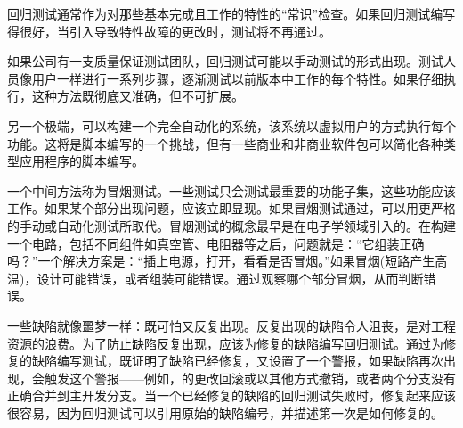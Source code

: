 回归测试通常作为对那些基本完成且工作的特性的“常识”检查。如果回归测试编写得很好，当引入导致特性故障的更改时，测试将不再通过。

如果公司有一支质量保证测试团队，回归测试可能以手动测试的形式出现。测试人员像用户一样进行一系列步骤，逐渐测试以前版本中工作的每个特性。如果仔细执行，这种方法既彻底又准确，但不可扩展。

另一个极端，可以构建一个完全自动化的系统，该系统以虚拟用户的方式执行每个功能。这将是脚本编写的一个挑战，但有一些商业和非商业软件包可以简化各种类型应用程序的脚本编写。

一个中间方法称为冒烟测试。一些测试只会测试最重要的功能子集，这些功能应该工作。如果某个部分出现问题，应该立即显现。如果冒烟测试通过，可以用更严格的手动或自动化测试所取代。冒烟测试的概念最早是在电子学领域引入的。在构建一个电路，包括不同组件如真空管、电阻器等之后，问题就是：“它组装正确吗？”一个解决方案是：“插上电源，打开，看看是否冒烟。”如果冒烟(短路产生高温)，设计可能错误，或者组装可能错误。通过观察哪个部分冒烟，从而判断错误。

一些缺陷就像噩梦一样：既可怕又反复出现。反复出现的缺陷令人沮丧，是对工程资源的浪费。为了防止缺陷反复出现，应该为修复的缺陷编写回归测试。通过为修复的缺陷编写测试，既证明了缺陷已经修复，又设置了一个警报，如果缺陷再次出现，会触发这个警报——例如，的更改回滚或以其他方式撤销，或者两个分支没有正确合并到主开发分支。当一个已经修复的缺陷的回归测试失败时，修复起来应该很容易，因为回归测试可以引用原始的缺陷编号，并描述第一次是如何修复的。






